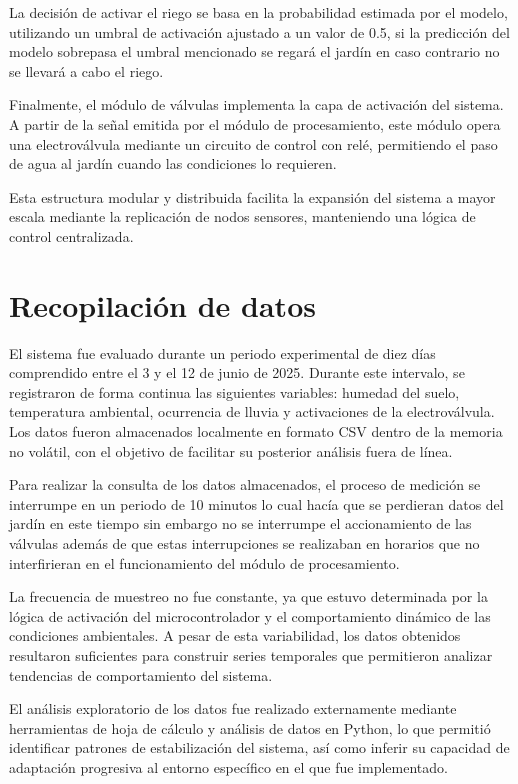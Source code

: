\documentclass[pdflatex,sn-mathphys-num]{sn-jnl}%
\theoremstyle{thmstyleone}%
\theoremstyle{thmstyletwo}%
\theoremstyle{thmstylethree}%
\begin{document}
La decisión de activar el riego se basa en la probabilidad estimada por el modelo, utilizando un umbral de activación ajustado a un valor de 0.5, si la predicción del modelo sobrepasa el umbral mencionado se regará el jardín en caso contrario no se llevará a cabo el riego. 

Finalmente, el módulo de válvulas implementa la capa de activación del sistema. A partir de la señal emitida por el módulo de procesamiento, este módulo opera una electroválvula mediante un circuito de control con relé, permitiendo el paso de agua al jardín cuando las condiciones lo requieren. 

Esta estructura modular y distribuida facilita la expansión del sistema a mayor escala mediante la replicación de nodos sensores, manteniendo una lógica de control centralizada.

\section{Recopilación de datos}

El sistema fue evaluado durante un periodo experimental de diez días comprendido entre el 3 y el 12 de junio de 2025. Durante este intervalo, se registraron de forma continua las siguientes variables: humedad del suelo, temperatura ambiental, ocurrencia de lluvia y activaciones de la electroválvula. Los datos fueron almacenados localmente en formato CSV dentro de la memoria no volátil, con el objetivo de facilitar su posterior análisis fuera de línea.

Para realizar la consulta de los datos almacenados, el proceso de medición se interrumpe en un periodo de 10 minutos lo cual hacía que se perdieran datos del jardín en este tiempo sin embargo no se interrumpe el accionamiento de las válvulas además de que estas interrupciones se realizaban en horarios que no interfirieran en el funcionamiento del módulo de procesamiento.

La frecuencia de muestreo no fue constante, ya que estuvo determinada por la lógica de activación del microcontrolador y el comportamiento dinámico de las condiciones ambientales. A pesar de esta variabilidad, los datos obtenidos resultaron suficientes para construir series temporales que permitieron analizar tendencias de comportamiento del sistema. 

El análisis exploratorio de los datos fue realizado externamente mediante herramientas de hoja de cálculo y análisis de datos en Python, lo que permitió identificar patrones de estabilización del sistema, así como inferir su capacidad de adaptación progresiva al entorno específico en el que fue implementado.
\end{document}
